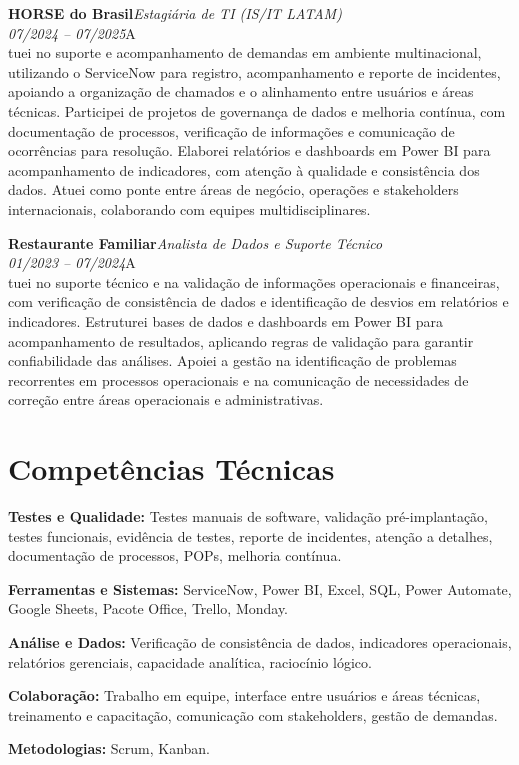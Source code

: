 \documentclass[11pt,a4paper]{article}
\newcommand{\cvrole}[4]{%
  \vspace{4pt}%
  {\bfseries\color{accentcolor}#1}\hfill{\itshape #2}\\[-2pt]%
  {\itshape #3}\hfill #4\\[6pt]%
}
\begin{document}
\cvrole{HORSE do Brasil}{Estagiária de TI (IS/IT LATAM)}{07/2024 -- 07/2025}

Atuei no suporte e acompanhamento de demandas em ambiente multinacional, utilizando o ServiceNow para registro, acompanhamento e reporte de incidentes, apoiando a organização de chamados e o alinhamento entre usuários e áreas técnicas. Participei de projetos de governança de dados e melhoria contínua, com documentação de processos, verificação de informações e comunicação de ocorrências para resolução. Elaborei relatórios e dashboards em Power BI para acompanhamento de indicadores, com atenção à qualidade e consistência dos dados. Atuei como ponte entre áreas de negócio, operações e stakeholders internacionais, colaborando com equipes multidisciplinares.

\cvrole{Restaurante Familiar}{Analista de Dados e Suporte Técnico}{01/2023 -- 07/2024}

Atuei no suporte técnico e na validação de informações operacionais e financeiras, com verificação de consistência de dados e identificação de desvios em relatórios e indicadores. Estruturei bases de dados e dashboards em Power BI para acompanhamento de resultados, aplicando regras de validação para garantir confiabilidade das análises. Apoiei a gestão na identificação de problemas recorrentes em processos operacionais e na comunicação de necessidades de correção entre áreas operacionais e administrativas.

\section{Competências Técnicas}

\textbf{Testes e Qualidade:} Testes manuais de software, validação pré-implantação, testes funcionais, evidência de testes, reporte de incidentes, atenção a detalhes, documentação de processos, POPs, melhoria contínua.

\textbf{Ferramentas e Sistemas:} ServiceNow, Power BI, Excel, SQL, Power Automate, Google Sheets, Pacote Office, Trello, Monday.

\textbf{Análise e Dados:} Verificação de consistência de dados, indicadores operacionais, relatórios gerenciais, capacidade analítica, raciocínio lógico.

\textbf{Colaboração:} Trabalho em equipe, interface entre usuários e áreas técnicas, treinamento e capacitação, comunicação com stakeholders, gestão de demandas.

\textbf{Metodologias:} Scrum, Kanban.
\end{document}
